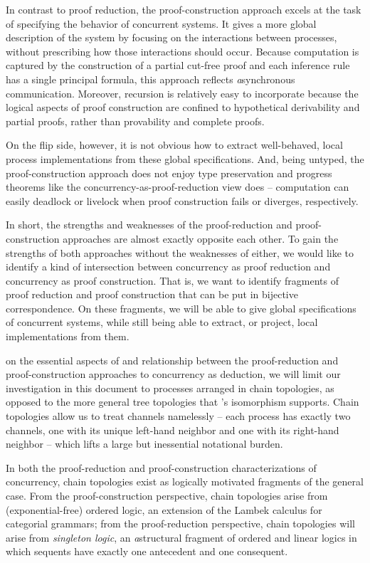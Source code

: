 In contrast to proof reduction, the proof-construction approach excels at the task of specifying the behavior of concurrent systems.
It gives a more global description of the system by focusing on the interactions between processes, without prescribing how those interactions should occur.
Because computation is captured by the construction of a partial cut-free proof and each inference rule has a single principal formula, this approach reflects \emph{a}syn\-chronous communication.
Moreover, recursion is relatively easy to incorporate because the logical aspects of proof construction are confined to hypothetical derivability and partial proofs, rather than provability and complete proofs.

On the flip side, however, it is not obvious how to extract well-behaved, local process implementations from these global specifications.
And, being untyped, the proof-construction approach does not enjoy type preservation and progress theorems like the concurrency-as-proof-reduction view does -- computation can easily deadlock or livelock when proof construction fails or diverges, respectively.

In short, the strengths and weaknesses of the proof-reduction and proof-construction approaches are almost exactly opposite each other.
To gain the strengths of both approaches without the weaknesses of either, we would like to identify a kind of intersection between concurrency as proof reduction and concurrency as proof construction.
That is, we want to identify fragments of proof reduction and proof construction that can be put in bijective correspondence.
On these fragments, we will be able to give global specifications of concurrent systems, while still being able to extract, or project, local implementations from them.

 on the essential aspects of and relationship between the proof-reduction and proof-construction approaches to concurrency as deduction, we will limit our investigation in this document to processes arranged in chain topologies, as opposed to the more general tree topologies that \citeauthor{Caires+:MSCS16}'s isomorphism supports.
Chain topologies allow us to treat channels namelessly -- each process has exactly two channels, one with its unique left-hand neighbor and one with its right-hand neighbor -- which lifts a large but inessential notational burden.

In both the proof-reduction and proof-construction characterizations of concurrency, chain topologies exist as logically motivated fragments of the general case.
From the proof-construction perspective, chain topologies arise from (exponential-free) ordered logic\autocites{Lambek:SLIM61}{Abrusci:MLQ90}{Kanazawa:LLI92}{Polakow+Pfenning:MFPS99}, an extension of the Lambek calculus for categorial grammars\autocite{Lambek:AMM58};
from the proof-reduction perspective, chain topologies will arise from \emph{singleton logic}\autocites{Santocanale:FOSSACS02}{Fortier+Santocanale:CSL13}, an \emph{a}struc\-tural fragment of ordered and linear logics in which sequents have exactly one antecedent and one consequent.

